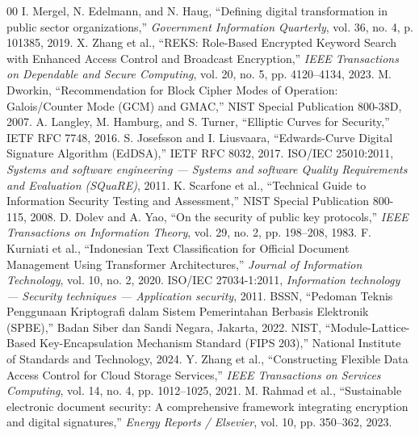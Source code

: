 \documentclass[conference]{IEEEtran}
\begin{document}
\begin{thebibliography}{00}
 I. Mergel, N. Edelmann, and N. Haug, ``Defining digital transformation in public sector organizations,'' \textit{Government Information Quarterly}, vol. 36, no. 4, p. 101385, 2019.
 X. Zhang et al., ``REKS: Role-Based Encrypted Keyword Search with Enhanced Access Control and Broadcast Encryption,'' \textit{IEEE Transactions on Dependable and Secure Computing}, vol. 20, no. 5, pp. 4120--4134, 2023.
 M. Dworkin, ``Recommendation for Block Cipher Modes of Operation: Galois/Counter Mode (GCM) and GMAC,'' NIST Special Publication 800-38D, 2007.
 A. Langley, M. Hamburg, and S. Turner, ``Elliptic Curves for Security,'' IETF RFC 7748, 2016.
 S. Josefsson and I. Liusvaara, ``Edwards-Curve Digital Signature Algorithm (EdDSA),'' IETF RFC 8032, 2017.
 ISO/IEC 25010:2011, \textit{Systems and software engineering --- Systems and software Quality Requirements and Evaluation (SQuaRE)}, 2011.
 K. Scarfone et al., ``Technical Guide to Information Security Testing and Assessment,'' NIST Special Publication 800-115, 2008.
 D. Dolev and A. Yao, ``On the security of public key protocols,'' \textit{IEEE Transactions on Information Theory}, vol. 29, no. 2, pp. 198--208, 1983.
 F. Kurniati et al., ``Indonesian Text Classification for Official Document Management Using Transformer Architectures,'' \textit{Journal of Information Technology}, vol. 10, no. 2, 2020.
 ISO/IEC 27034-1:2011, \textit{Information technology --- Security techniques --- Application security}, 2011.
 BSSN, ``Pedoman Teknis Penggunaan Kriptografi dalam Sistem Pemerintahan Berbasis Elektronik (SPBE),'' Badan Siber dan Sandi Negara, Jakarta, 2022.
 NIST, ``Module-Lattice-Based Key-Encapsulation Mechanism Standard (FIPS 203),'' National Institute of Standards and Technology, 2024.
 Y. Zhang et al., ``Constructing Flexible Data Access Control for Cloud Storage Services,'' \textit{IEEE Transactions on Services Computing}, vol. 14, no. 4, pp. 1012--1025, 2021.
 M. Rahmad et al., ``Sustainable electronic document security: A comprehensive framework integrating encryption and digital signatures,'' \textit{Energy Reports / Elsevier}, vol. 10, pp. 350--362, 2023.
\end{thebibliography}
\end{document}
